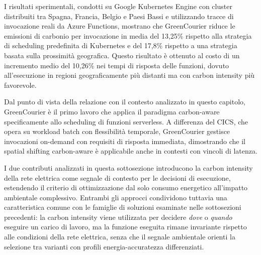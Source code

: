 I risultati sperimentali, condotti su Google Kubernetes Engine con
cluster distribuiti tra Spagna, Francia, Belgio e Paesi Bassi e
utilizzando tracce di invocazione reali da Azure Functions, mostrano che
GreenCourier riduce le emissioni di carbonio per invocazione in media
del 13,25\% rispetto alla strategia di scheduling predefinita di
Kubernetes e del 17,8\% rispetto a una strategia basata sulla
prossimità geografica. Questo risultato è ottenuto al costo di un
incremento medio del 10,26\% nei tempi di risposta delle funzioni,
dovuto all'esecuzione in regioni geograficamente più distanti ma con
carbon intensity più favorevole.

Dal punto di vista della relazione con il contesto analizzato in questo
capitolo, GreenCourier è il primo lavoro che applica il paradigma
carbon-aware specificamente allo scheduling di funzioni serverless. A
differenza del CICS, che opera su workload batch con flessibilità
temporale, GreenCourier gestisce invocazioni on-demand con requisiti di
risposta immediata, dimostrando che il spatial shifting carbon-aware è
applicabile anche in contesti con vincoli di latenza.


\vspace{0.5em}

I due contributi analizzati in questa sottosezione introducono la carbon
intensity della rete elettrica come segnale di contesto per le decisioni
di esecuzione, estendendo il criterio di ottimizzazione dal solo consumo
energetico all'impatto ambientale complessivo. Entrambi gli approcci
condividono tuttavia una caratteristica comune con le famiglie di
soluzioni esaminate nelle sottosezioni precedenti: la carbon intensity
viene utilizzata per decidere \emph{dove} o \emph{quando} eseguire un
carico di lavoro, ma la funzione eseguita rimane invariante rispetto
alle condizioni della rete elettrica, senza che il segnale ambientale
orienti la selezione tra varianti con profili energia-accuratezza
differenziati.
